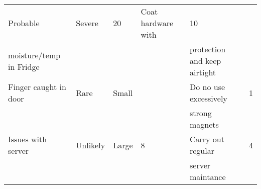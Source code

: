 \begin{table}[H]
\begin{tabular}{|l|l|l|l|l|l|}
      Probable &
      Severe &
      \cellcolor[HTML]{FD6864}20 &
      Coat hardware with &
      \cellcolor[HTML]{FCFF2F}10 \\
    moisture/temp in Fridge &            &        & \cellcolor[HTML]{FD6864}                          & protection and keep airtight & \cellcolor[HTML]{FCFF2F}   \\ \hline
    Finger caught in door &
      Rare &
      Small &
      \cellcolor[HTML]{67FD9A}{\color[HTML]{000000} 2} &
      Do no use excessively &
      \cellcolor[HTML]{67FD9A}1 \\
                            &            &        & \cellcolor[HTML]{67FD9A}{\color[HTML]{000000} }   & strong magnets               & \cellcolor[HTML]{67FD9A}   \\ \hline
    Issues with server      & Unlikely   & Large  & \cellcolor[HTML]{F8FF00}8                         & Carry out regular            & \cellcolor[HTML]{67FD9A}4  \\
                            &            &        & \cellcolor[HTML]{F8FF00}                          & server maintance             & \cellcolor[HTML]{67FD9A}   \\ \hline
    \end{tabular}
\end{table}

